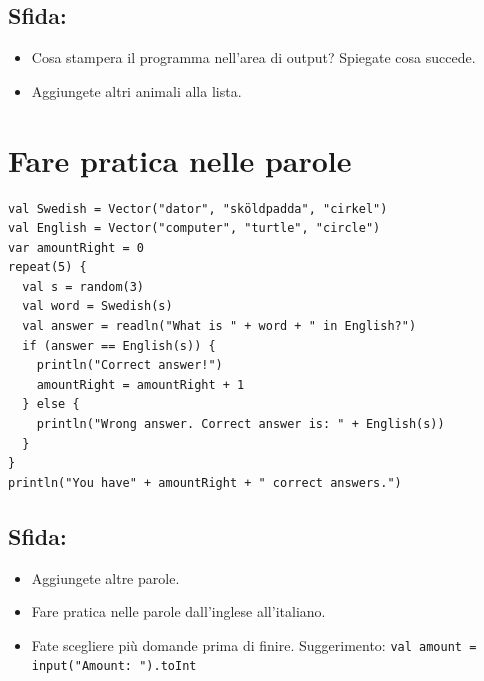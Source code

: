 \section*{\color{BrickRed}Sfida:}


\begin{itemize}

\item {Cosa stampera il programma nell'area di output? Spiegate cosa succede.}
\item {Aggiungete altri animali alla lista.}

\end{itemize}


\chapter{Fare pratica nelle parole}
\begin{lstlisting}[basicstyle={\ttfamily\fontsize{14}{17}\selectfont},numbers=none]
val Swedish = Vector("dator", "sköldpadda", "cirkel")
val English = Vector("computer", "turtle", "circle")
var amountRight = 0
repeat(5) {
  val s = random(3)
  val word = Swedish(s)
  val answer = readln("What is " + word + " in English?")
  if (answer == English(s)) {
    println("Correct answer!")
    amountRight = amountRight + 1
  } else {
    println("Wrong answer. Correct answer is: " + English(s))
  }
}
println("You have" + amountRight + " correct answers.")
\end{lstlisting}
        
\section*{\color{BrickRed}Sfida:}


\begin{itemize}

\item {Aggiungete altre parole.}
\item {Fare pratica nelle parole dall'inglese all'italiano.}
\item {Fate scegliere più domande prima di finire. Suggerimento: \lstinline{val amount = input("Amount: ").toInt} }

\end{itemize}


